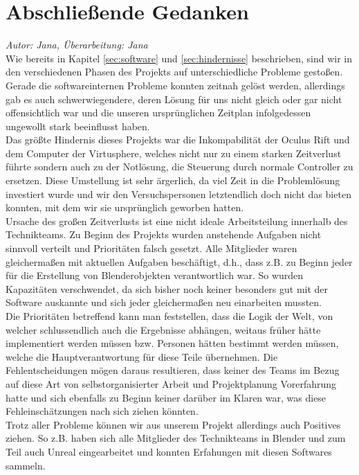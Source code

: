 \documentclass{Bericht}
\begin{document}
\section{Abschließende Gedanken} %
\textit{Autor: Jana, Überarbeitung: Jana}\\
	Wie bereits in Kapitel \ref{sec:software} und \ref{sec:hindernisse} beschrieben, sind wir in den verschiedenen Phasen des Projekts auf unterschiedliche Probleme gestoßen. Gerade die softwareinternen Probleme konnten zeitnah gelöst werden, allerdings gab es auch schwerwiegendere, deren Lösung für uns nicht gleich oder gar nicht offensichtlich war und die unseren ursprünglichen Zeitplan infolgedessen ungewollt stark beeinflusst haben.\\
Das größte Hindernis dieses Projekts war die Inkompabilität der Oculus Rift und dem Computer der Virtusphere, welches nicht nur zu einem starken Zeitverlust führte sondern auch zu der Notlösung, die Steuerung durch normale Controller zu ersetzen. Diese Umstellung ist sehr ärgerlich, da viel Zeit in die Problemlösung investiert wurde und wir den Versuchspersonen letztendlich doch nicht das bieten konnten, mit dem wir sie ursprünglich geworben hatten.\\
Ursache des großen Zeitverlusts ist eine nicht ideale Arbeitsteilung innerhalb des Technikteams.
Zu Beginn des Projekts wurden anstehende Aufgaben nicht sinnvoll verteilt und Prioritäten falsch gesetzt. Alle Mitglieder waren gleichermaßen mit aktuellen Aufgaben beschäftigt, d.h., dass z.B. zu Beginn jeder für die Erstellung von Blenderobjekten verantwortlich war. So wurden Kapazitäten verschwendet, da sich bisher noch keiner besonders gut mit der Software auskannte und sich jeder gleichermaßen neu einarbeiten mussten. \\
Die Prioritäten betreffend kann man feststellen, dass die Logik der Welt, von welcher schlussendlich auch die Ergebnisse abhängen, weitaus früher hätte implementiert werden müssen bzw. Personen hätten bestimmt werden müssen, welche die Hauptverantwortung für diese Teile übernehmen.
Die Fehlentscheidungen mögen daraus resultieren, dass keiner des Teams im Bezug auf diese Art von selbstorganisierter Arbeit und Projektplanung Vorerfahrung hatte und sich ebenfalls zu Beginn keiner darüber im Klaren war, was diese Fehleinschätzungen nach sich ziehen könnten.\\
	Trotz aller Probleme können wir aus unserem Projekt allerdings auch Positives ziehen. So z.B. haben sich alle Mitglieder des Technikteams in Blender und zum Teil auch Unreal eingearbeitet und konnten Erfahungen mit diesen Softwares sammeln. 
\end{document}
